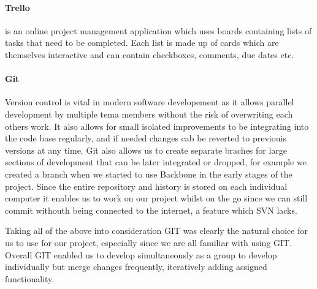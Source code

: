     \paragraph{Trello\cite{trello}} is an online project management application which uses boards containing lists of tasks that need to be completed. Each list is made up of cards which are themselves interactive and can contain checkboxes, comments, due dates etc. 

    \paragraph{Git\cite{git}} Version control is vital in modern software developement as it allows parallel development by multiple tema members without the risk of overwriting each others work. It also allows for small isolated improvements to be integrating into the code base regularly, and if needed changes cab be reverted to previouis versions at any time. Git also allows us to create separate braches for large sections of development that can be later integrated or dropped, for example we created a branch when we started to use Backbone in the early stages of the project.
    Since the entire repository and history is stored on each individual computer it enables us to work on our project whilst on the go since we can still commit withouth being connected to the internet, a feature which SVN lacks.

    Taking all of the above into consideration GIT was clearly the natural choice for us to use for our project, especially since we are all familiar with using GIT.
    Overall GIT enabled us to develop simultaneously as a group to develop individually but merge changes frequently, iteratively adding assigned functionality.
